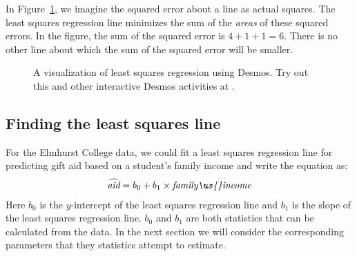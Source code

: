 In Figure~\ref{leastSquares}, we imagine the squared error about a line as actual squares.  The least squares regression line minimizes the sum of the \emph{areas} of these squared errors.  In the figure, the sum of the squared error is $4+1+1=6$.  There is no other line about which the sum of the squared error will be smaller.

\begin{figure}[h]
\centering
{}
\caption{A visualization of least squares regression using Desmos.  Try out this and other interactive Desmos activities at .}
\label{leastSquares}
\end{figure}


\D{\newpage}
 
\subsection{Finding the least squares line}
\label{findingTheLeastSquaresLineSection}

For the Elmhurst College data, we could fit a least squares regression line for predicting gift aid based on a student's family income and write the equation as:
\begin{eqnarray*}
\widehat{\textit{aid}} = b_0 + b_1\times \textit{family\us{}income}
\end{eqnarray*}
Here $b_0$ is the $y$-intercept of the least squares regression line and $b_1$ is the slope of the least squares regression line.  $b_0$ and $b_1$ are both statistics that can be calculated from the data.  In the next section we will consider the corresponding parameters that they statistics attempt to estimate.  

